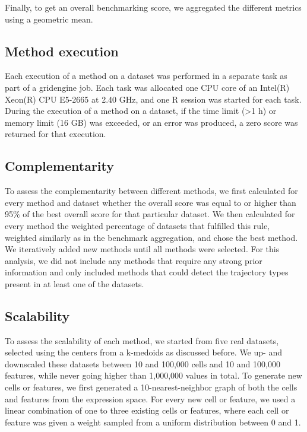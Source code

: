 Finally, to get an overall benchmarking score, we aggregated the different metrics using a geometric mean.

\subsection{Method execution}

Each execution of a method on a dataset was performed in a separate task as part of a gridengine job. Each task was allocated one CPU core of an Intel(R) Xeon(R) CPU E5-2665 at 2.40 GHz, and one R session was started for each task. During the execution of a method on a dataset, if the time limit (>1 h) or memory limit (16 GB) was exceeded, or an error was produced, a zero score was returned for that execution.

\subsection{Complementarity}

To assess the complementarity between different methods, we first calculated for every method and dataset whether the overall score was equal to or higher than 95$\%$ of the best overall score for that particular dataset. We then calculated for every method the weighted percentage of datasets that fulfilled this rule, weighted similarly as in the benchmark aggregation, and chose the best method. We iteratively added new methods until all methods were selected. For this analysis, we did not include any methods that require any strong prior information and only included methods that could detect the trajectory types present in at least one of the datasets.

\subsection{Scalability}

To assess the scalability of each method, we started from five real datasets, selected using the centers from a k-medoids as discussed before. We up- and downscaled these datasets between 10 and 100,000 cells and 10 and 100,000 features, while never going higher than 1,000,000 values in total. To generate new cells or features, we first generated a 10-nearest-neighbor graph of both the cells and features from the expression space. For every new cell or feature, we used a linear combination of one to three existing cells or features, where each cell or feature was given a weight sampled from a uniform distribution between 0 and 1.

